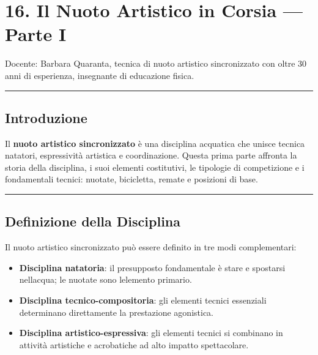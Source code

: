 \documentclass[a4paper,11pt]{article}
\providecommand{\tightlist}{%
  \setlength{\itemsep}{0pt}\setlength{\parskip}{0pt}}
\begin{document}
\section{16. Il Nuoto Artistico in Corsia --- Parte
  I}\label{il-nuoto-artistico-in-corsia-parte-i}

Docente: Barbara Quaranta, tecnica di nuoto artistico sincronizzato con
oltre 30 anni di esperienza, insegnante di educazione fisica.

\begin{center}\rule{0.5\linewidth}{0.5pt}\end{center}

\subsection{Introduzione}\label{introduzione-15}

Il \textbf{nuoto artistico sincronizzato} è una disciplina acquatica che
unisce tecnica natatori, espressività artistica e coordinazione. Questa
prima parte affronta la storia della disciplina, i suoi elementi
costitutivi, le tipologie di competizione e i fondamentali tecnici:
nuotate, bicicletta, remate e posizioni di base.

\begin{center}\rule{0.5\linewidth}{0.5pt}\end{center}

\subsection{Definizione della
      Disciplina}\label{definizione-della-disciplina}

Il nuoto artistico sincronizzato può essere definito in tre modi
complementari:

\begin{itemize}
      \tightlist
      \item
            \textbf{Disciplina natatoria}: il presupposto fondamentale è stare e
            spostarsi nell\textquotesingle acqua; le nuotate sono
            l\textquotesingle elemento primario.
      \item
            \textbf{Disciplina tecnico-compositoria}: gli elementi tecnici
            essenziali determinano direttamente la prestazione agonistica.
      \item
            \textbf{Disciplina artistico-espressiva}: gli elementi tecnici si
            combinano in attività artistiche e acrobatiche ad alto impatto
            spettacolare.
\end{itemize}
\end{document}
